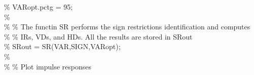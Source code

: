 \hspace{1mm}\hspace{5mm} \hspace{5mm} \hspace{5mm} \hspace{5mm} \hspace{5mm} \textcolor{matlabgreen}{\% VARopt.pctg = 95; }\\ 
\hspace{1mm}\hspace{5mm} \hspace{5mm} \hspace{5mm} \hspace{5mm} \hspace{5mm} \textcolor{matlabgreen}{\%  }\\ 
\hspace{1mm}\hspace{5mm} \hspace{5mm} \hspace{5mm} \hspace{5mm} \hspace{5mm} \textcolor{matlabgreen}{\% }\textcolor{matlabgreen}{\% The functin SR performs the sign restrictions identification and computes }\\ 
\hspace{1mm}\hspace{5mm} \hspace{5mm} \hspace{5mm} \hspace{5mm} \hspace{5mm} \textcolor{matlabgreen}{\% }\textcolor{matlabgreen}{\% IRs, VDs, and HDs. All the results are stored in SRout }\\ 
\hspace{1mm}\hspace{5mm} \hspace{5mm} \hspace{5mm} \hspace{5mm} \hspace{5mm} \textcolor{matlabgreen}{\% SRout = SR(VAR,SIGN,VARopt); }\\ 
\hspace{1mm}\hspace{5mm} \hspace{5mm} \hspace{5mm} \hspace{5mm} \hspace{5mm} \textcolor{matlabgreen}{\%  }\\ 
\hspace{1mm}\hspace{5mm} \hspace{5mm} \hspace{5mm} \hspace{5mm} \hspace{5mm} \textcolor{matlabgreen}{\% }\textcolor{matlabgreen}{\% Plot impulse responses }\\ 
